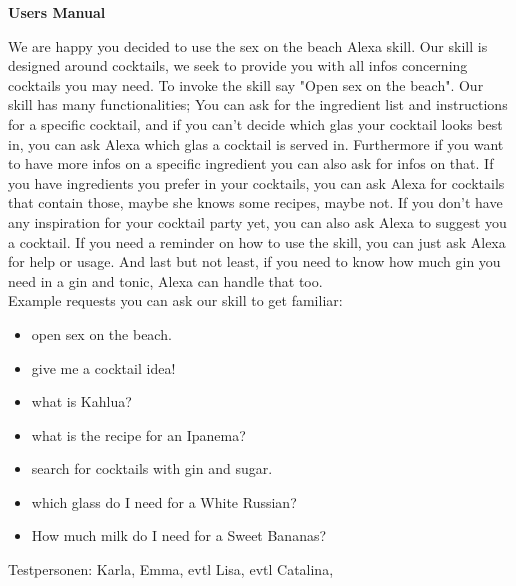 \documentclass[12pt,letterpaper]{article}
\begin{document}
\begin{adjustwidth}{1cm}{1cm}
\textbf{Users Manual}

We are happy you decided to use the sex on the beach Alexa skill. Our skill is designed around cocktails, we seek to provide you with all infos concerning cocktails you may need. To invoke the skill say "Open sex on the beach".
Our skill has many functionalities; You can ask for the ingredient list and instructions for a specific cocktail, and if you can’t decide which glas your cocktail looks best in, you can ask Alexa which glas a cocktail is served in. Furthermore if you want to have more infos on a specific ingredient you can also ask for infos on that. If you have ingredients you prefer in your cocktails, you can ask Alexa for cocktails that contain those, maybe she knows some recipes, maybe not. If you don’t have any inspiration for your cocktail party yet, you can also ask Alexa to suggest you a cocktail.
If you need a reminder on how to use the skill, you can just ask Alexa for help or usage. And last but not least, if you need to know how much gin you need in a gin and tonic, Alexa can handle that too.
\\

Example requests you can ask our skill to get familiar:
\begin{itemize}

\item open sex on the beach.

\item give me a cocktail idea!

\item what is Kahlua?

\item what is the recipe for an Ipanema?

\item search for cocktails with gin and sugar.

\item which glass do I need for a White Russian?

\item How much milk do I need for a Sweet Bananas?
\end{itemize}

\end{adjustwidth}

Testpersonen:
    Karla, Emma, evtl Lisa, evtl Catalina, 
\end{document}
